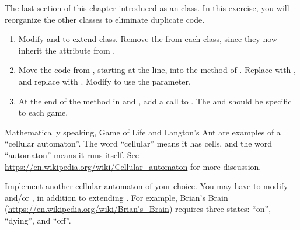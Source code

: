 \begin{exercise}
The last section of this chapter introduced  as an  class.
In this exercise, you will reorganize the other classes to eliminate duplicate code.

\begin{enumerate}

\item Modify  and  to extend  class.
Remove the  from each class, since they now inherit the  attribute from .

\item Move the code from , starting at the  line, into the  method of .
Replace  with , and replace  with .
Modify  to use the  parameter.

\item At the end of the  method in  and , add a call to .
The  and  should be specific to each game.

\end{enumerate}

\end{exercise}


\begin{exercise}
Mathematically speaking, Game of Life and Langton's Ant are examples of a ``cellular automaton''.
The word ``cellular'' means it has cells, and the word ``automaton'' means it runs itself.
See \url{https://en.wikipedia.org/wiki/Cellular_automaton} for more discussion.

Implement another cellular automaton of your choice.
You may have to modify  and/or , in addition to extending .
For example, Brian's Brain (\url{https://en.wikipedia.org/wiki/Brian's_Brain}) requires three states: ``on'', ``dying'', and ``off''.
\end{exercise}

